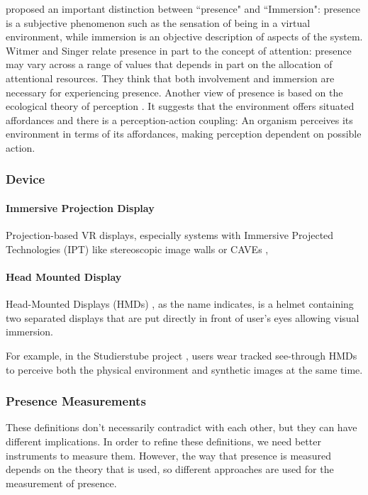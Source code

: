 \citet{Slater1994DepthPre} proposed an important distinction between ``presence" and ``Immersion": presence is a subjective phenomenon such as the sensation of being in a virtual environment, while immersion is an objective description of aspects of the system.
Witmer and Singer relate presence in part to the concept of attention: presence may vary across a range of values that depends in part on the allocation of attentional resources.
They think that both involvement and immersion are necessary for experiencing presence.
Another view of presence is based on the ecological theory of perception \citep{Gibson2014Ecological}.
It suggests that the environment offers situated affordances and there is a perception-action coupling: An organism perceives its environment in terms of its affordances, making perception dependent on possible action.




\subsubsection{Device}
\paragraph{Immersive Projection Display}
Projection-based VR displays, especially systems with Immersive Projected Technologies (IPT) like stereoscopic image walls or CAVEs \citep{CruzNeira1993SPV}, 


\paragraph{Head Mounted Display}
Head-Mounted Displays (HMDs) \citep{Melzer1997HMD}, as the name indicates, is a helmet containing two separated displays that are put directly in front of user's eyes allowing visual immersion. 

For example, in the Studierstube project \citep{Schmalstieg2002Stube}, users wear tracked see-through HMDs to perceive both the physical environment and synthetic images at the same time.

\subsubsection{Presence Measurements}
These definitions don't necessarily contradict with each other, but they can have different implications.
In order to refine these definitions, we need better instruments to measure them.
However, the way that presence is measured depends on the theory that is used, so different approaches are used for the measurement of presence.

